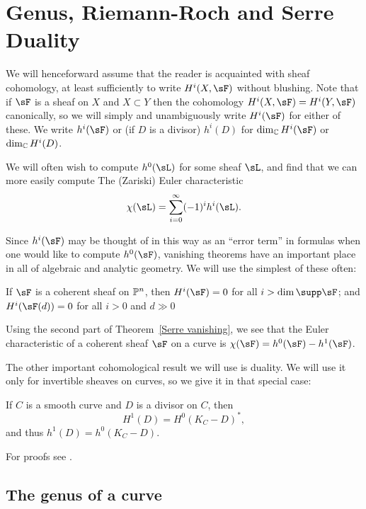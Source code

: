 \section{Genus, Riemann-Roch and Serre Duality}

We will henceforward assume that the reader is acquainted with sheaf cohomology, at least sufficiently to write
$H^i(X, \sF)$ without blushing. Note that if $\sF$ is a sheaf on $X$ and $X\subset Y$ then the cohomology  $H^i(X, \sF) = H^i(Y,\sF)$ canonically, so we will
simply and unambiguously write $H^i(\sF)$ for either of these. 
We write $h^i(\sF)$ or (if $D$ is a divisor) $h^{i}(D)$ for $\dim_{\CC}H^i(\sF)$ or $\dim_{\CC}H^i(D)$. 

We will often wish to compute $h^0(\sL)$ for some
sheaf $\sL$, and find that we can more easily compute 
The (Zariski) Euler characteristic 
$$
\chi(\sL) = \sum_{i=0}^\infty (-1)^ih^i(\sL).
$$

Since $h^{i}(\sF)$ may be thought of in this way as an ``error term'' in formulas when one would like to compute
$h^{0}(\sF)$,  vanishing theorems have an important place in all of algebraic and analytic geometry. We will use the simplest of these often:


\begin{theorem}\label{Serre vanishing} If $\sF$ is a coherent sheaf on $\PP^n$, then
$H^{i}(\sF)= 0$ for all $i>\dim \supp \sF$; and  $H^{i}(\sF(d))= 0$ for all $i>0$ and $d\gg 0$  
\end{theorem}

Using the second part of Theorem~\ref{Serre vanishing}, we see that the Euler characteristic of a coherent sheaf $\sF$ on a curve
 is  $\chi(\sF) = h^0(\sF) - h^1(\sF)$.
 
 The other important cohomological result we will use is duality. We will use it only for invertible sheaves on curves, so we give it in
 that special case:
 
\begin{theorem}\label{sd}
If $C$ is a smooth curve and $D$ is a divisor on $C$, then
$$
H^1(D) =H^0(K_C-D)^*,
$$
and thus $h^1(D) = h^0(K_C-D)$.
\end{theorem}

For proofs see \cite[]{H}. 

\subsection{The genus of a curve}

